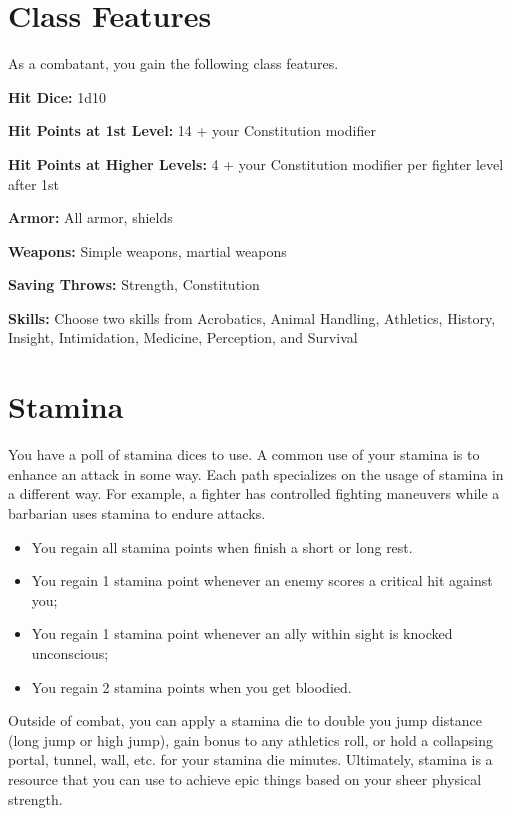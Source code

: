 \begin{multicols*}{2}

\section*{Class Features} 

As a combatant, you gain the following class features.

\textbf{Hit Dice:} 1d10

\textbf{Hit Points at 1st Level:} 14 + your Constitution modifier

\textbf{Hit Points at Higher Levels:} 4 + your Constitution modifier per fighter level after 1st


\textbf{Armor:} All armor, shields

\textbf{Weapons:} Simple weapons, martial weapons

\textbf{Saving Throws:} Strength, Constitution

\textbf{Skills:} Choose two skills from Acrobatics, Animal Handling, Athletics, History, Insight, Intimidation, Medicine, Perception, and Survival 
    
\section*{Stamina} 

You have a poll of stamina dices to use. A common use of your stamina is to enhance an attack in some way. Each path specializes on the usage of stamina in a different way. For example, a fighter has controlled fighting maneuvers while a barbarian uses stamina to endure attacks.



\begin{itemize}
    \item You regain all stamina points when finish a short or long rest.
    \item You regain 1 stamina point whenever an enemy scores a critical hit against you;
    \item You regain 1 stamina point whenever an ally within sight is knocked unconscious;
    \item You regain 2 stamina points when you get bloodied.
\end{itemize}

Outside of combat, you can apply a stamina die to double you jump distance (long jump or high jump), gain bonus to any athletics roll, or hold a collapsing portal, tunnel, wall, etc. for your stamina die minutes. Ultimately, stamina is a resource 
that you can use to achieve epic things based on your sheer physical strength. 


\end{multicols*}
